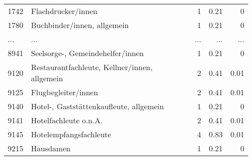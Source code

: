 \begin{longtable}{lXrrr}
        1742 & \multicolumn{1}{X}{Flachdrucker/innen} & %
          \num{1} &
          \num[round-mode=places,round-precision=2]{0.21} &
          \num[round-mode=places,round-precision=2]{0} \\
        1780 & \multicolumn{1}{X}{Buchbinder/innen, allgemein} & %
          \num{1} &
          \num[round-mode=places,round-precision=2]{0.21} &
          \num[round-mode=places,round-precision=2]{0} \\
       ... & ... & ... & ... & ... \\
        8941 & \multicolumn{1}{X}{Seelsorge-, Gemeindehelfer/innen} & %
          \num{1} &
          \num[round-mode=places,round-precision=2]{0.21} &
          \num[round-mode=places,round-precision=2]{0} \\

        9120 & \multicolumn{1}{X}{Restaurantfachleute, Kellner/innen, allgemein} & %
          \num{2} &
          \num[round-mode=places,round-precision=2]{0.41} &
          \num[round-mode=places,round-precision=2]{0.01} \\

        9125 & \multicolumn{1}{X}{Flugbegleiter/innen} & %
          \num{2} &
          \num[round-mode=places,round-precision=2]{0.41} &
          \num[round-mode=places,round-precision=2]{0.01} \\

        9140 & \multicolumn{1}{X}{Hotel-, Gaststättenkaufleute, allgemein} & %
          \num{1} &
          \num[round-mode=places,round-precision=2]{0.21} &
          \num[round-mode=places,round-precision=2]{0} \\

        9141 & \multicolumn{1}{X}{Hotelfachleute o.n.A.} & %
          \num{2} &
          \num[round-mode=places,round-precision=2]{0.41} &
          \num[round-mode=places,round-precision=2]{0.01} \\

        9145 & \multicolumn{1}{X}{Hotelempfangsfachleute} & %
          \num{4} &
          \num[round-mode=places,round-precision=2]{0.83} &
          \num[round-mode=places,round-precision=2]{0.01} \\

        9215 & \multicolumn{1}{X}{Hausdamen} & %
          \num{1} &
          \num[round-mode=places,round-precision=2]{0.21} &
          \num[round-mode=places,round-precision=2]{0} \\


\end{longtable}
